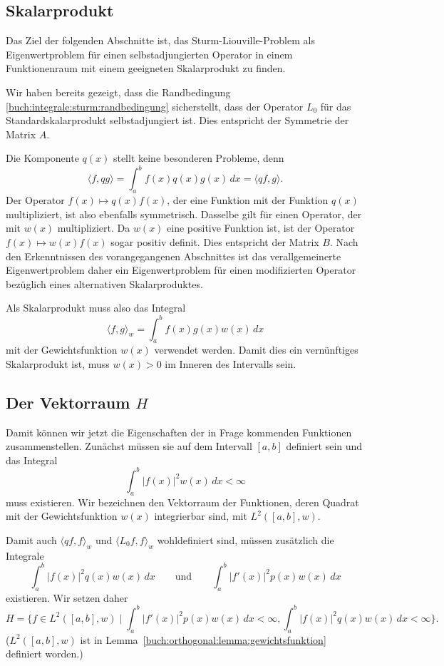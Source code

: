 %
%
\subsection{Skalarprodukt}
Das Ziel der folgenden Abschnitte ist, das Sturm-Liouville-Problem als
Eigenwertproblem für einen selbstadjungierten Operator in einem 
Funktionenraum mit einem geeigneten Skalarprodukt zu finden.

Wir haben bereits gezeigt, dass die Randbedingung
\eqref{buch:integrale:sturm:randbedingung} sicherstellt, dass der
Operator $L_0$ für das Standardskalarprodukt selbstadjungiert ist.
Dies entspricht der Symmetrie der Matrix $A$.

Die Komponente $q(x)$ stellt keine besonderen Probleme, denn
\[
\langle f,qg\rangle
=
\int_a^b f(x)q(x)g(x)\,dx
=
\langle qf,g\rangle.
\]
Der Operator $f(x) \mapsto q(x)f(x)$, der eine Funktion mit 
der Funktion $q(x)$ multipliziert, ist also ebenfalls symmetrisch.
Dasselbe gilt für einen Operator, der mit $w(x)$ multipliziert.
Da $w(x)$ eine positive Funktion ist, ist der Operator $f(x)\mapsto w(x)f(x)$
sogar positiv definit.
Dies entspricht der Matrix $B$.
Nach den Erkenntnissen des vorangegangenen Abschnittes ist das
verallgemeinerte Eigenwertproblem daher ein Eigenwertproblem
für einen modifizierten Operator bezüglich eines alternativen
Skalarproduktes.

Als Skalarprodukt muss also das Integral
\[
\langle f,g\rangle_w
=
\int_a^b f(x)g(x)w(x)\,dx
\]
mit der Gewichtsfunktion $w(x)$ verwendet werden.
Damit dies ein vernünftiges Skalarprodukt ist, muss $w(x)>0$ im
Inneren des Intervalls sein.

%
%
\subsection{Der Vektorraum $H$}
Damit können wir jetzt die Eigenschaften der in Frage kommenden
Funktionen zusammenstellen.
Zunächst müssen sie auf dem Intervall $[a,b]$ definiert sein und
das Integral
\[
\int_a^b |f(x)|^2 w(x)\,dx < \infty
\]
muss existieren.
Wir bezeichnen den Vektorraum der Funktionen, deren Quadrat mit
der Gewichtsfunktion $w(x)$ integrierbar sind, mit
$L^2([a,b],w)$.

Damit auch $\langle qf,f\rangle_w$ und $\langle L_0f,f\rangle_w$
wohldefiniert sind, müssen zusätzlich die Integrale
\[
\int_a^b |f(x)|^2 q(x) w(x)\,dx
\qquad\text{und}\qquad
\int_a^b |f'(x)|^2 p(x) w(x)\,dx
\]
existieren.
Wir setzen daher
\[
H
=
\biggl\{
f\in L^2([a,b],w)\;\bigg|\;
\int_a^b |f'(x)|^2p(x)w(x)\,dx<\infty,
\int_a^b |f(x)|^2q(x)w(x)\,dx<\infty
\biggr\}.
\]
($L^2([a,b],w)$ ist in 
Lemma~\ref{buch:orthogonal:lemma:gewichtsfunktion}
definiert worden.)

